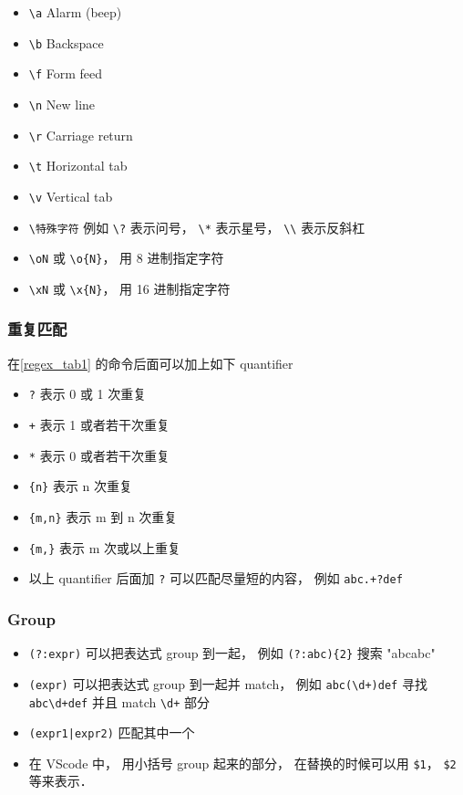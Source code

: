 \begin{itemize}
\item \verb`\a` Alarm (beep)
\item \verb`\b` Backspace
\item \verb`\f` Form feed
\item \verb`\n` New line
\item \verb`\r` Carriage return
\item \verb`\t` Horizontal tab
\item \verb`\v` Vertical tab
\item \verb`\特殊字符` 例如 \verb`\?` 表示问号， \verb`\*` 表示星号， \verb`\\` 表示反斜杠
\item \verb`\oN` 或 \verb`\o{N}`， 用 8 进制指定字符
\item \verb`\xN` 或 \verb`\x{N}`， 用 16 进制指定字符
\end{itemize}

\subsubsection{重复匹配}
在\autoref{regex_tab1} 的命令后面可以加上如下 quantifier
\begin{itemize}
\item \verb|?| 表示 0 或 1 次重复
\item \verb|+| 表示 1 或者若干次重复
\item \verb|*| 表示 0 或者若干次重复
\item \verb|{n}| 表示 n 次重复
\item \verb|{m,n}| 表示 m 到 n 次重复
\item \verb|{m,}| 表示 m 次或以上重复
\item 以上 quantifier 后面加 \verb|?| 可以匹配尽量短的内容， 例如 \verb|abc.+?def|
\end{itemize}

\subsubsection{Group}
\begin{itemize}
\item \verb|(?:expr)| 可以把表达式 group 到一起， 例如 \verb|(?:abc){2}| 搜索 "abcabc"
\item \verb|(expr)| 可以把表达式 group 到一起并 match， 例如 \verb|abc(\d+)def| 寻找 \verb|abc\d+def| 并且 match \verb|\d+| 部分
\item \verb`(expr1|expr2)` 匹配其中一个
\item 在 VScode 中， 用小括号 group 起来的部分， 在替换的时候可以用 \verb|$1|， \verb|$2| 等来表示．
\end{itemize}
